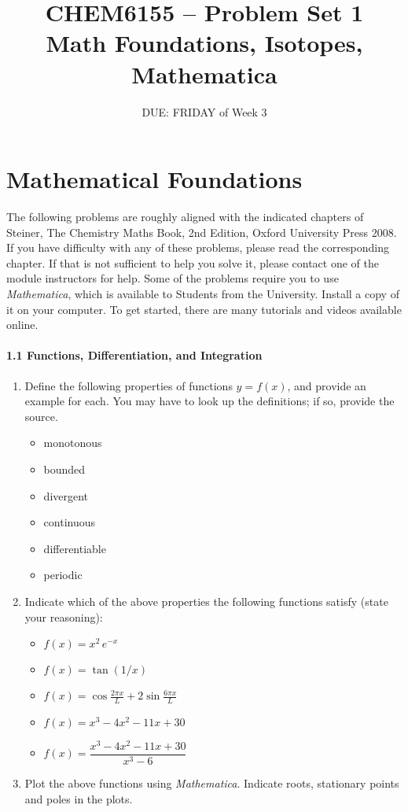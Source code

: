 \documentclass{chem6155problemset}
\title{CHEM6155 -- Problem Set 1\\Math Foundations, Isotopes, Mathematica}
\date{DUE: FRIDAY of Week 3}
\begin{document}
\maketitle

\section{Mathematical Foundations}
The following problems are roughly aligned with the indicated chapters of Steiner, The Chemistry
Maths Book, 2nd Edition, Oxford University Press 2008. If you have difficulty with any
of these problems, please read the corresponding chapter. If that is not sufficient
to help you solve it, please contact one of the module instructors for help. Some of the problems
require you to use \emph{Mathematica}, which is available to Students from the University. 
Install a copy of it on your computer. To get started, there are many tutorials and videos
available online.

\paragraph{1.1 Functions, Differentiation, and Integration}
\begin{enumerate}
 	\item Define the following properties of functions $y=f(x)$, and provide an example for each. You
	may have to look up the definitions; if so, provide the source.
	  \begin{itemize}
	  	\item monotonous
		\item bounded
		\item divergent
		\item continuous
		\item differentiable
		\item periodic
	  \end{itemize}
	  
	 \item Indicate which of the above properties the following functions satisfy (state
	 your reasoning):
	 	\begin{itemize}
			\item $f(x)=x^2\,e^{-x}$
			\item $f(x)=\tan(1/x)$
			\item $f(x)=\cos\frac{2\pi x}{L} + 2 \sin\frac{6\pi x}{L}$
			\item $f(x) = x^3-4x^2-11x+30$
			\item $f(x) = \dfrac{x^3-4x^2-11x+30}{x^3-6}$
		\end{itemize}
		
	\item Plot the above functions using \emph{Mathematica}. Indicate roots, stationary points
	and poles in the plots.
	 
\end{enumerate}
\end{document}
